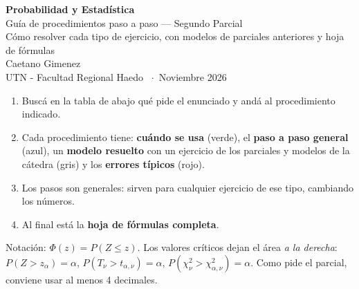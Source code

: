 \documentclass[11pt,a4paper]{article}
\newcommand{\chis}{\chi^2}
\begin{document}
\begin{center}
{\LARGE\bfseries\color{azul} Probabilidad y Estadística}\\[4pt]
{\large Guía de procedimientos paso a paso --- Segundo Parcial}\\[2pt]
{\normalsize Cómo resolver cada tipo de ejercicio, con modelos de parciales anteriores y hoja de fórmulas}\\[8pt]
{\normalsize Caetano Gimenez}\\[1pt]
{\small UTN - Facultad Regional Haedo \ $\cdot$\ Noviembre 2026}
\end{center}

\begin{tcolorbox}[colback=white,colframe=azul!60,boxrule=0.5pt,arc=2pt,title={\bfseries Cómo usar esta guía},colbacktitle=azul!80,fonttitle=\small]
\small
\begin{enumerate}[leftmargin=14pt]
\item Buscá en la tabla de abajo qué pide el enunciado y andá al procedimiento indicado.
\item Cada procedimiento tiene: \textbf{cuándo se usa} (verde), el \textbf{paso a paso general} (azul), un \textbf{modelo resuelto} con un ejercicio de los parciales y modelos de la cátedra (gris) y los \textbf{errores típicos} (rojo).
\item Los pasos son generales: sirven para cualquier ejercicio de ese tipo, cambiando los números.
\item Al final está la \textbf{hoja de fórmulas completa}.
\end{enumerate}
Notación: $\Phi(z)=P(Z\le z)$. Los valores críticos dejan el área \emph{a la derecha}: $P(Z>z_\alpha)=\alpha$, $P(T_\nu>t_{\alpha,\nu})=\alpha$, $P(\chis_\nu>\chis_{\alpha,\nu})=\alpha$. Como pide el parcial, conviene usar al menos 4 decimales.
\end{tcolorbox}
\end{document}
